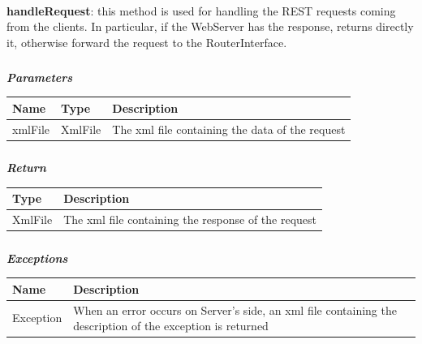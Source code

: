 					\paragraph{}
							\textbf{handleRequest}: this method is used for handling the REST requests coming from the clients. In particular, if the WebServer has the response, returns directly it, otherwise forward the request to the RouterInterface.
							\subparagraph{}
							\vspace{-3mm}
							\textcolor{myBlue}{\textit{\textbf{Parameters}}}
							\vspace{-2mm}
								\begin{table}[!h]
									\begin{tabular}{L{0.15\textwidth}L{0.15\textwidth}L{0.58\textwidth}}
										\toprule
										\textbf{Name} & \textbf{Type} & \textbf{Description} \\
										\midrule
								  		xmlFile & XmlFile & The xml file containing the data of the request \\
								 		\bottomrule
									\end{tabular}
								\end{table}
							\subparagraph{}
							\vspace{-6mm}
								\textcolor{myGreen}{\textit{\textbf{Return}}}
								\vspace{-2mm}
									\begin{table}[!h]
									\begin{tabular}{L{0.15\textwidth}L{0.77\textwidth}}
										\toprule
										\textbf{Type} & \textbf{Description} \\
										\midrule
								  		XmlFile & The xml file containing the response of the request \\
								 		\bottomrule
									\end{tabular}
								\end{table}
							\subparagraph{}
							\vspace{-6mm}
								\textcolor{myRed}{\textit{\textbf{Exceptions}}}
								\vspace{-2mm}
									\begin{table}[!h]
									\begin{tabular}{L{0.15\textwidth}L{0.77\textwidth}}
										\toprule
										\textbf{Name} & \textbf{Description} \\
										\midrule
								  		Exception & When an error occurs on Server's side, an xml file containing the description of the exception is returned \\ 
								 		\bottomrule
									\end{tabular}
								\end{table}	
